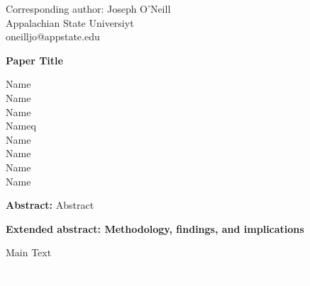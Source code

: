 \documentclass[12pt]{article}
\begin{document}
\begin{flushleft}
   \begin{footnotesize}
      Corresponding author:
      Joseph O'Neill\\
Appalachian State Universiyt\\
oneilljo@appstate.edu
   \end{footnotesize}
\end{flushleft}

\begin{center}
   \textbf{Paper Title}
\end{center}

\begin{center}
   \begin{footnotesize}
      Name\\
Name\\
Name\\
Nameq\\
Name\\
Name\\
Name\\
Name
   \end{footnotesize}
\end{center}

\begin{adjustwidth}{0.5in}{0.5in}
\begin{footnotesize}
   \setlength{\parindent}{0cm}
   \textbf{Abstract:} Abstract
\end{footnotesize}
\end{adjustwidth}
\vspace{3mm}

\begin{flushleft}
\textbf{Extended abstract: Methodology, findings, and implications}
\end{flushleft}
Main Text

\begin{figure}[H]
   \centering
   \includegraphics[max width=\textwidth]{Default.png}
   \caption{ }
\end{figure}
\end{document}
